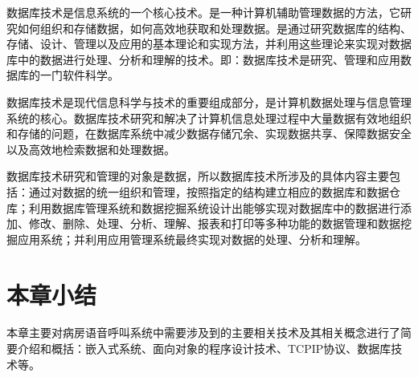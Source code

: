 数据库技术是信息系统的一个核心技术。是一种计算机辅助管理数据的方法，它研究如何组织和存储数据，如何高效地获取和处理数据。是通过研究数据库的结构、存储、设计、管理以及应用的基本理论和实现方法，并利用这些理论来实现对数据库中的数据进行处理、分析和理解的技术。即：数据库技术是研究、管理和应用数据库的一门软件科学。

数据库技术是现代信息科学与技术的重要组成部分，是计算机数据处理与信息管理系统的核心。数据库技术研究和解决了计算机信息处理过程中大量数据有效地组织和存储的问题，在数据库系统中减少数据存储冗余、实现数据共享、保障数据安全以及高效地检索数据和处理数据。

数据库技术研究和管理的对象是数据，所以数据库技术所涉及的具体内容主要包括：通过对数据的统一组织和管理，按照指定的结构建立相应的数据库和数据仓库；利用数据库管理系统和数据挖掘系统设计出能够实现对数据库中的数据进行添加、修改、删除、处理、分析、理解、报表和打印等多种功能的数据管理和数据挖掘应用系统；并利用应用管理系统最终实现对数据的处理、分析和理解。

\section{本章小结}
本章主要对病房语音呼叫系统中需要涉及到的主要相关技术及其相关概念进行了简要介绍和概括：嵌入式系统、面向对象的程序设计技术、\acrshort{TCPIP}协议、数据库技术等。